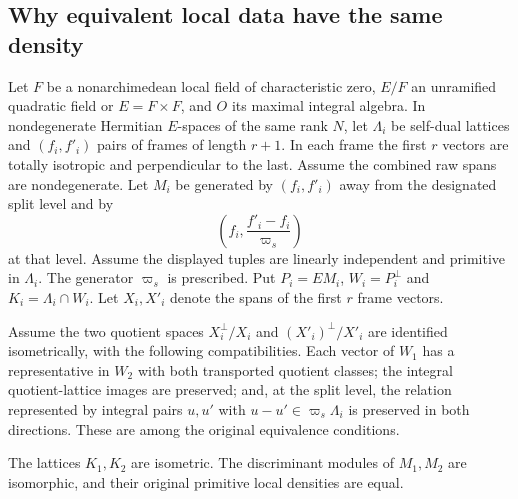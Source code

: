 \subsection{Why equivalent local data have the same density}
\label{sec:scalar-pair-local-density}

Let $F$ be a nonarchimedean local field of characteristic zero,
$E/F$ an unramified quadratic field or $E=F\times F$, and $O$ its
maximal integral algebra. In nondegenerate Hermitian $E$-spaces of the
same rank $N$, let $\Lambda_i$ be self-dual lattices and
$(f_i,f'_i)$ pairs of frames of length $r+1$. In each frame the first
$r$ vectors are totally isotropic and perpendicular to the last.
Assume the combined raw spans are nondegenerate. Let $M_i$ be generated
by $(f_i,f'_i)$ away from the designated split level and by
\[
       \left(f_i,\frac{f'_i-f_i}{\varpi_s}\right)
\]
at that level. Assume the displayed tuples are linearly independent
and primitive in $\Lambda_i$. The generator $\varpi_s$ is prescribed.
Put $P_i=EM_i$, $W_i=P_i^\perp$ and $K_i=\Lambda_i\cap W_i$.
Let $X_i,X'_i$ denote the spans of the first $r$ frame vectors.

Assume the two quotient spaces $X_i^\perp/X_i$ and
$(X'_i)^\perp/X'_i$ are identified isometrically, with the following
compatibilities. Each vector of $W_1$ has a representative in $W_2$
with both transported quotient classes; the integral quotient-lattice
images are preserved; and, at the split level, the relation represented
by integral pairs $u,u'$ with $u-u'\in\varpi_s\Lambda_i$ is preserved
in both directions. These are among the original equivalence
conditions.

\begin{proposition}
The lattices $K_1,K_2$ are isometric. The discriminant modules of
$M_1,M_2$ are isomorphic, and their original primitive local densities
are equal.
\end{proposition}

